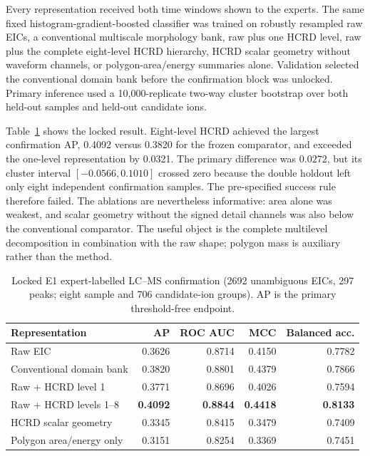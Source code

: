 Every representation received both time windows shown to the experts.  The
same fixed histogram-gradient-boosted classifier was trained on robustly
resampled raw EICs, a conventional multiscale morphology bank, raw plus one
HCRD level, raw plus the complete eight-level HCRD hierarchy, HCRD scalar
geometry without waveform channels, or polygon-area/energy summaries alone.
Validation selected the conventional domain bank before the confirmation block
was unlocked.  Primary inference used a 10,000-replicate two-way cluster
bootstrap over both held-out samples and held-out candidate ions.

Table~\ref{tab:lcms-e1} shows the locked result.  Eight-level HCRD achieved the
largest confirmation AP, 0.4092 versus 0.3820 for the frozen comparator, and
exceeded the one-level representation by 0.0321.  The primary difference was
$0.0272$, but its cluster interval $[-0.0566,0.1010]$ crossed zero because the
double holdout left only eight independent confirmation samples.  The
pre-specified success rule therefore failed.  The ablations are nevertheless
informative: area alone was weakest, and scalar geometry without the signed
detail channels was also below the conventional comparator.  The useful object
is the complete multilevel decomposition in combination with the raw shape;
polygon mass is auxiliary rather than the method.

\begin{table}[H]
\centering
\caption{Locked E1 expert-labelled LC--MS confirmation (2692 unambiguous EICs,
297 peaks; eight sample and 706 candidate-ion groups).  AP is the primary
threshold-free endpoint.}
\label{tab:lcms-e1}
\begin{tabular}{lrrrr}
\toprule
Representation & AP & ROC AUC & MCC & Balanced acc. \\
\midrule
Raw EIC & 0.3626 & 0.8714 & 0.4150 & 0.7782 \\
Conventional domain bank & 0.3820 & 0.8801 & 0.4379 & 0.7866 \\
Raw + HCRD level 1 & 0.3771 & 0.8696 & 0.4026 & 0.7594 \\
Raw + HCRD levels 1--8 & \textbf{0.4092} & \textbf{0.8844} & \textbf{0.4418} & \textbf{0.8133} \\
HCRD scalar geometry & 0.3345 & 0.8415 & 0.3479 & 0.7409 \\
Polygon area/energy only & 0.3151 & 0.8254 & 0.3369 & 0.7451 \\
\bottomrule
\end{tabular}
\end{table}


